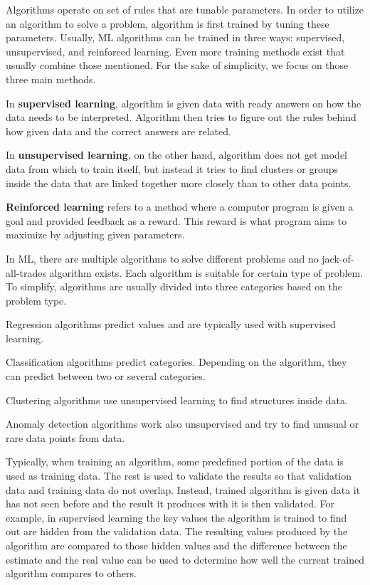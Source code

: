 Algorithms operate on set of rules
that are tunable parameters.
In order to utilize an algorithm to solve a problem,
algorithm is first trained by tuning these parameters.
Usually,
ML algorithms can be trained in three ways:
supervised, unsupervised, and reinforced learning.\cite{jordan2015machine}
Even more training methods exist
that usually combine those mentioned.\cite{ayodele2010types, mahesh2020machine}
For the sake of simplicity,
we focus on those three main methods.

In \textbf{supervised learning},
algorithm is given data with ready answers on
how the data needs to be interpreted.
Algorithm then tries to figure out the rules behind
how given data and the correct answers are related.\cite{ayodele2010types}


In \textbf{unsupervised learning},
on the other hand,
algorithm does not get model data from which to train itself,
but instead it tries to find clusters or groups inside the data
that are linked together more closely than to other data points.

\textbf{Reinforced learning} refers to a method
where a computer program is given a goal
and provided feedback as a reward.
This reward is what program aims to maximize
by adjusting given parameters. %

In ML,
there are multiple algorithms to solve different problems
and no jack-of-all-trades algorithm exists.
Each algorithm is suitable for certain type of problem.
To simplify,
algorithms are usually divided into three categories
based on the problem type.

Regression algorithms predict values
and are typically used with supervised learning.


Classification algorithms predict categories.
Depending on the algorithm,
they can predict between two or several categories.

Clustering algorithms use unsupervised learning
to find structures inside data.

Anomaly detection algorithms work also unsupervised
and try to find unusual or rare data points from data.





Typically,
when training an algorithm,
some predefined portion of the data
is used as training data.
The rest is used to validate the results
so that validation data and training data do not overlap.
Instead, trained algorithm is given data it has not seen before
and the result it produces with it is then validated.
For example,
in supervised learning
the key values the algorithm is trained to find out
are hidden from the validation data.
The resulting values produced by the algorithm
are compared to those hidden values
and the difference between the estimate and the real value
can be used to determine how well the current trained algorithm compares to others.


